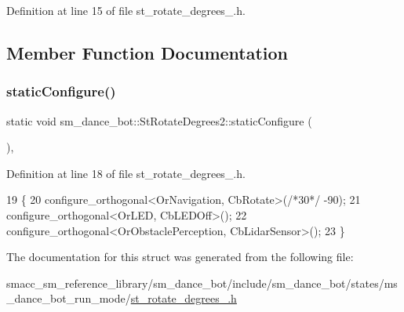 Definition at line 15 of file st\+\_\+rotate\+\_\+degrees\+\_.\+h.



\subsection{Member Function Documentation}
\mbox{\label{structsm__dance__bot_1_1StRotateDegrees2_ac6566aa987d37915d13b974a8fe8df42}} 
\subsubsection{\texorpdfstring{static\+Configure()}{staticConfigure()}}
{\footnotesize\ttfamily static void sm\+\_\+dance\+\_\+bot\+::\+St\+Rotate\+Degrees2\+::static\+Configure (\begin{DoxyParamCaption}{ }\end{DoxyParamCaption})\hspace{0.3cm}{\ttfamily [inline]}, {\ttfamily [static]}}



Definition at line 18 of file st\+\_\+rotate\+\_\+degrees\+\_.\+h.


\begin{DoxyCode}
19   \{
20     configure\_orthogonal<OrNavigation, CbRotate>(\textcolor{comment}{/*30*/} -90);
21     configure\_orthogonal<OrLED, CbLEDOff>();
22     configure\_orthogonal<OrObstaclePerception, CbLidarSensor>();
23   \}
\end{DoxyCode}


The documentation for this struct was generated from the following file\+:\begin{DoxyCompactItemize}
\item 
smacc\+\_\+sm\+\_\+reference\+\_\+library/sm\+\_\+dance\+\_\+bot/include/sm\+\_\+dance\+\_\+bot/states/ms\+\_\+dance\+\_\+bot\+\_\+run\+\_\+mode/\hyperlink{st__rotate__degrees__2_8h}{st\+\_\+rotate\+\_\+degrees\+\_.\+h}\end{DoxyCompactItemize}
